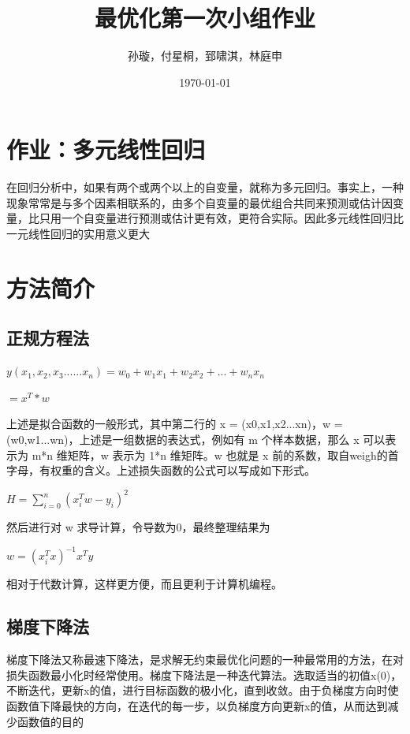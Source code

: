 \documentclass[12pt, a4paper, oneside, fontset=windows]{ctexart}
\title{\textbf{最优化第一次小组作业}}
\author{孙璇，付星桐，郅啸淇，林庭申}
\date{\today}
\begin{document}
\pagestyle{empty}
\maketitle

\setcounter{page}{0}
\maketitle
\thispagestyle{empty}



\newpage
\setcounter{page}{1}
\tableofcontents
\newpage
\setcounter{page}{1}

\newpage
\section*{作业：多元线性回归}
在回归分析中，如果有两个或两个以上的自变量，就称为多元回归。事实上，一种现象常常是与多个因素相联系的，由多个自变量的最优组合共同来预测或估计因变量，比只用一个自变量进行预测或估计更有效，更符合实际。因此多元线性回归比一元线性回归的实用意义更大


\section{方法简介}
\subsection{正规方程法}
$y(x_{1},x_{2},x_{3}......x_{n}) = w_{0} + w_{1}x_{1} + w_{2}x_{2}+...+w_{n}x_{n}$

$ = x^{T}*w$

上述是拟合函数的一般形式，其中第二行的 x = (x0,x1,x2...xn)，w = (w0,w1...wn)，上述是一组数据的表达式，例如有 m 个样本数据，那么 x 可以表示为 m*n 维矩阵，w 表示为 1*n 维矩阵。w 也就是 x 前的系数，取自weigh的首字母，有权重的含义。上述损失函数的公式可以写成如下形式。

$H=\sum_{i=0}^{n} (x_{i}^{T}w - y_{i})^{2}$


然后进行对 w 求导计算，令导数为0，最终整理结果为

$w = (x^{T}_{i}x)^{-1}x^{T}y$

相对于代数计算，这样更方便，而且更利于计算机编程。

\subsection{梯度下降法}
梯度下降法又称最速下降法，是求解无约束最优化问题的一种最常用的方法，在对损失函数最小化时经常使用。梯度下降法是一种迭代算法。选取适当的初值x(0)，不断迭代，更新x的值，进行目标函数的极小化，直到收敛。由于负梯度方向时使函数值下降最快的方向，在迭代的每一步，以负梯度方向更新x的值，从而达到减少函数值的目的
\end{document}
